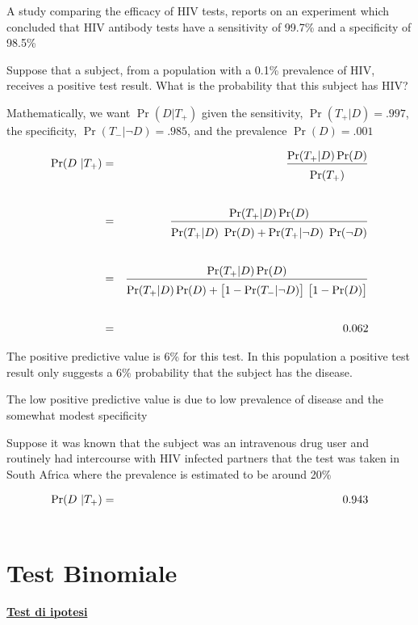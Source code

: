 \documentclass[12pt,openany]{book}
\theoremstyle{mio}
\theoremstyle{liscio}
\begin{document}
A study comparing the efficacy of HIV tests, reports on an
experiment which concluded that HIV antibody tests have a
{\color{violet}sensitivity of 99.7\%} and a {\color{violet}specificity of 98.5\%}

Suppose that a subject, from a population with a {\color{violet} 0.1\% prevalence}
of HIV, receives a positive test result. What is the probability
that this subject has HIV?

Mathematically, we want $\Pr(D | T_+)$ given the sensitivity, {\color{violet}$\Pr(T_+
| D) = .997$}, the specificity, {\color{violet}$\Pr(T_- | \neg D) =.985$}, and the
prevalence {\color{violet}$\Pr(D) = .001$}

\begin{eqnarray*}
\Pr(D ~|T_+)& = &\frac{\Pr(T_+|D)\Pr(D)}{\Pr(T_+)\vphantom{\Big[}}\\ \\
& = &\frac{\Pr(T_+|D)\Pr(D)}{\Pr(T_+|D)\ \Pr(D) + \Pr(T_+|\neg D)\ \Pr(\neg D)\vphantom{\Big[}}\\ \\
& = & \frac{\Pr(T_+|D)\Pr(D)}{\Pr(T_+|D)\Pr(D) + \big[1-\Pr(T_-|\neg D)\big]\ \big[1 - \Pr(D)\big]\vphantom{\Big[}} \\ \\
& = & 0.062
\end{eqnarray*}

The {\color{violet}positive predictive value is 6\%} for this test. In this population a positive test result only suggests a 6\% probability that the subject has the disease. 


The low positive predictive value is due to low prevalence of disease and the
somewhat modest specificity 

Suppose it was known that the subject was an intravenous drug user and routinely had intercourse with HIV infected partners that the test was taken in South Africa where the prevalence is estimated to be around 20\%

\begin{eqnarray*}
\Pr(D ~|T_+)& = & 0.943\\
& \hphantom{=} & \hphantom{\frac{\Pr(T_+|D)\Pr(D)}{\Pr(T_+|D)\Pr(D) + \big[1-\Pr(T_-|\neg D)\big]\ \big[1 - \Pr(D)\big]\vphantom{\Big[}}}
\end{eqnarray*}


\hfill{}\clearpage\section{Test Binomiale}
\hfill\textbf{{\color{brown}\hyperref[test_ipotesi]{Test di ipotesi \faShare}}}
\end{document}
